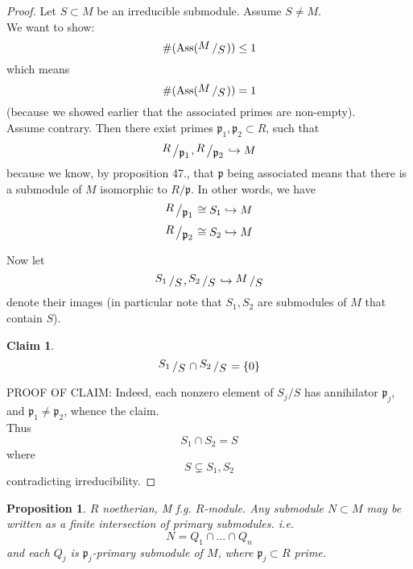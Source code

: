 \documentclass[12pt]{article}
\DeclareMathOperator{\Ass}{Ass}
\newcommand{\bigslant}[2]{{\raisebox{.2em}{$#1$}\left/\raisebox{-.2em}{$#2$}\right.}}
\def\p{\mathfrak{p}}
\newtheorem{prop}[theorem]{Proposition}
\newtheorem*{claim}{Claim}
\theoremstyle{definition}
\begin{document}
\begin{proof}
Let $S \subset M$ be an irreducible submodule. Assume $S \neq M$.\\
We want to show:
\[
\#(\Ass(\bigslant{M}{S})) \leq 1
\]
which means
\[
\#(\Ass(\bigslant{M}{S})) = 1
\]
(because we showed earlier that the associated primes are non-empty).\\
Assume contrary. Then there exist primes $\p_1,\p_2 \subset R$, such that
\[
\bigslant{R}{\p_1},\bigslant{R}{\p_2} \hookrightarrow M
\]
because we know, by proposition 47., that $\p$ being associated means that there is a submodule of $M$ isomorphic to $R/\p$. In other words, we have
\[
\bigslant{R}{\p_1} \cong S_1 \hookrightarrow M
\]
\[
\bigslant{R}{\p_2} \cong S_2 \hookrightarrow M
\]


Now let 
\[
\bigslant{S_1}{S},\bigslant{S_2}{S} \hookrightarrow \bigslant{M}{S}
\]
denote their images (in particular note that $S_1,S_2$ are submodules of $M$ that contain $S$).
\begin{claim}
\[
\bigslant{S_1}{S} \cap \bigslant{S_2}{S} = \{0\}
\]
\end{claim}
PROOF OF CLAIM: Indeed, each nonzero element of $S_j/S$ has annihilator $\p_j$, and $\p_1 \neq \p_2$, whence the claim.\\
Thus
\[
S_1\cap S_2 = S
\]
where
\[
S \subsetneq S_1,S_2
\]
contradicting irreducibility.
\end{proof}
\begin{prop}
$R$ noetherian, M f.g. $R$-module. Any submodule $N\subset M$ may be written as a finite intersection of primary submodules. i.e.
\[
N = Q_1 \cap \dots \cap Q_n
\]
and each $Q_j$ is $\p_j$-primary submodule of $M$, where $\p_j\subset R$ prime.
\end{prop}
\end{document}
